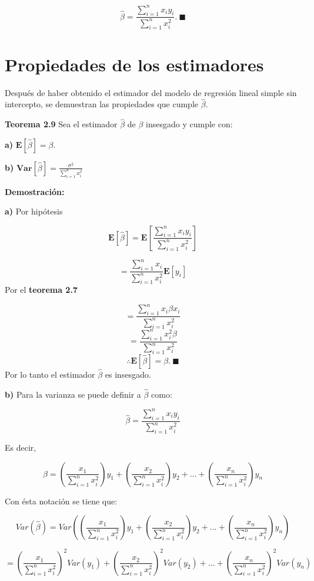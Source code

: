 \documentclass[
  a4paper,
  oneside,
  openany]{book}
\begin{document}
\[\hat{\beta}=\frac{\sum_{i=1}^{n}x_{i}y_{i}}{\sum_{i=1}^{n}x_{i}^2}. \ \blacksquare\]

\hypertarget{propiedades-de-los-estimadores-1}{%
\section{Propiedades de los estimadores}\label{propiedades-de-los-estimadores-1}}

Después de haber obtenido el estimador del modelo de regresión lineal simple sin intercepto, se demuestran las propiedades que cumple \(\hat{\beta}.\)

\textbf{Teorema 2.9} Sea el estimador \(\hat{\beta}\) de \(\beta\) insesgado y cumple con:

\textbf{a)} \(\mathbf{E}\left[\hat{\beta}\right]=\beta.\)

\textbf{b)} \(\textbf{Var}\left[ \hat{\beta}\right]=\frac{\sigma^2}{\sum_{i=1}^{n}x_{i}^2}\)

\textbf{Demostración:}

\textbf{a)} Por hipótesis

\[\mathbf{E}\left[\hat{\beta}\right]=\mathbf{E}\left[\frac{\sum_{i=1}^{n}x_{i}y_{i}}{\sum_{i=1}^{n}x_{i}^2}\right]\]

\[=\frac{\sum_{i=1}^{n}x_{i}}{{\sum_{i=1}^{n}x_{i}^2}}\mathbf{E}[y_{i}]\]
Por el \textbf{teorema 2.7}

\[=\frac{\sum_{i=1}^{n}x_{i}\beta x_{i}}{{\sum_{i=1}^{n}x_{i}^2}}\]
\[=\frac{\sum_{i=1}^{n}x_{i}^2\beta}{{\sum_{i=1}^{n}x_{i}^2}}\]
\[\therefore \mathbf{E}\left[\hat{\beta}\right]=\beta. \ \blacksquare\]
Por lo tanto el estimador \(\hat{\beta}\) es insesgado.

\textbf{b)} Para la varianza se puede definir a \(\hat{\beta}\) como:

\[\hat{\beta}=\frac{\sum_{i=1}^{n}x_{i}y_{i}}{\sum_{i=1}^{n}x_{i}^2}\]

Es decir,

\[\hat{\beta}=\left(\frac{x_{1}}{\sum_{i=1}^{n}x_{i}^2}\right)y_{1} + \left(\frac{x_{2}}{\sum_{i=1}^{n}x_{i}^2}\right)y_{2} + \ldots + \left(\frac{x_{n}}{\sum_{i=1}^{n}x_{i}^2}\right)y_{n}\]

Con ésta notación se tiene que:

\[Var\left(\hat{\beta}\right)=Var\left( \left(\frac{x_{1}}{\sum_{i=1}^{n}x_{i}^2}\right)y_{1} + \left(\frac{x_{2}}{\sum_{i=1}^{n}x_{i}^2}\right)y_{2} + \ldots + \left(\frac{x_{n}}{\sum_{i=1}^{n}x_{i}^2}\right)y_{n} \right)\]

\[=\left(\frac{x_{1}}{\sum_{i=1}^{n}x_{i}^2}\right)^2Var(y_{1}) + \left(\frac{x_{2}}{\sum_{i=1}^{n}x_{i}^2}\right)^2Var(y_{2}) + \ldots + \left(\frac{x_{n}}{\sum_{i=1}^{n}x_{i}^2}\right)^2Var(y_{n})\]
\end{document}
